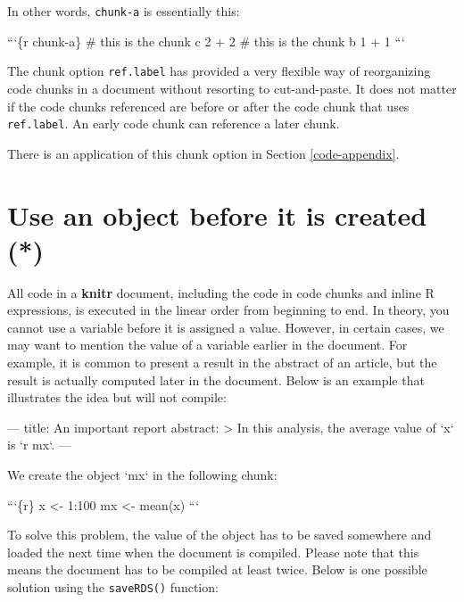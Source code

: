 \documentclass[
  11pt,
]{krantz}
\newenvironment{Shaded}{\begin{snugshade}}{\end{snugshade}}
\newcommand{\BaseNTok}[1]{\textcolor[rgb]{0.06,0.06,0.06}{#1}}
\newcommand{\NormalTok}[1]{#1}
\begin{document}
In other words, \texttt{chunk-a} is essentially this:

\begin{Shaded}
\begin{Highlighting}[]
\BaseNTok{```\{r chunk-a\}}
\BaseNTok{# this is the chunk c}
\BaseNTok{2 + 2}
\BaseNTok{# this is the chunk b}
\BaseNTok{1 + 1}
\BaseNTok{```}
\end{Highlighting}
\end{Shaded}

The chunk option \texttt{ref.label} has provided a very flexible way of reorganizing code chunks in a document without resorting to cut-and-paste. It does not matter if the code chunks referenced are before or after the code chunk that uses \texttt{ref.label}. An early code chunk can reference a later chunk.

There is an application of this chunk option in Section \ref{code-appendix}.

\hypertarget{load-cache}{%
\section{Use an object before it is created (*)}\label{load-cache}}

All code in a \textbf{knitr} document, including the code in code chunks and inline R expressions, is executed in the linear order from beginning to end. In theory, you cannot use a variable before it is assigned a value. However, in certain cases, we may want to mention the value of a variable earlier in the document. For example, it is common to present a result in the abstract of an article, but the result is actually computed later in the document. Below is an example that illustrates the idea but will not compile:

\begin{Shaded}
\begin{Highlighting}[]
\NormalTok{---}
\NormalTok{title: An important report}
\NormalTok{abstract: >}
\NormalTok{  In this analysis, the average value of}
  \BaseNTok{`x`}\NormalTok{ is }\BaseNTok{`r mx`}\NormalTok{.}
\NormalTok{---}

\NormalTok{We create the object }\BaseNTok{`mx`}\NormalTok{ in the following chunk:}

\BaseNTok{```\{r\}}
\BaseNTok{x <- 1:100}
\BaseNTok{mx <- mean(x)}
\BaseNTok{```}
\end{Highlighting}
\end{Shaded}

To solve this problem, the value of the object has to be saved somewhere and loaded the next time when the document is compiled. Please note that this means the document has to be compiled at least twice. Below is one possible solution using the \texttt{saveRDS()} function:
\end{document}
